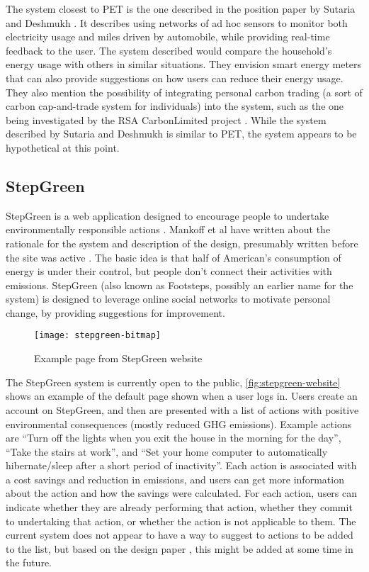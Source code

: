 The system closest to PET is the one described in the position paper by Sutaria and Deshmukh \cite{sutaria-2008}. It describes using networks of ad hoc sensors to monitor both electricity usage and miles driven by automobile, while providing real-time feedback to the user. The system described would compare the household's energy usage with others in similar situations. They envision smart energy meters that can also provide suggestions on how users can reduce their energy usage. They also mention the possibility of integrating personal carbon trading (a sort of carbon cap-and-trade system for individuals) into the system, such as the one being investigated by the RSA CarbonLimited project \cite{carbonlimited-2007}. While the system described by Sutaria and Deshmukh is similar to PET, the system appears to be hypothetical at this point.

\subsection{StepGreen}

StepGreen is a web application designed to encourage people to undertake environmentally responsible actions \cite{step-green-website}. Mankoff et al have written about the rationale for the system and description of the design, presumably written before the site was active \cite{Mankoff2007Leveraging-Soci}. The basic idea is that half of American's consumption of energy is under their control, but people don't connect their activities with \COtwo emissions. StepGreen (also known as Footsteps, possibly an earlier name for the system) is designed to leverage online social networks to motivate personal change, by providing suggestions for improvement.

\begin{figure}[htbp]
	\begin{center}
		\texttt{[image: stepgreen-bitmap]}
		\caption{Example page from StepGreen website}
		\label{fig:stepgreen-website}
 	\end{center}
\end{figure}

The StepGreen system is currently open to the public, \autoref{fig:stepgreen-website} shows an example of the default page shown when a user logs in. Users create an account on StepGreen, and then are presented with a list of actions with positive environmental consequences (mostly reduced GHG emissions). Example actions are ``Turn off the lights when you exit the house in the morning for the day'', ``Take the stairs at work'', and ``Set your home computer to automatically hibernate/sleep after a short period of inactivity''. Each action is associated with a cost savings and reduction in \COtwo emissions, and users can get more information about the action and how the savings were calculated. For each action, users can indicate whether they are already performing that action, whether they commit to undertaking that action, or whether the action is not applicable to them. The current system does not appear to have a way to suggest to actions to be added to the list, but based on the design paper \cite{Mankoff2007Leveraging-Soci}, this might be added at some time in the future.

